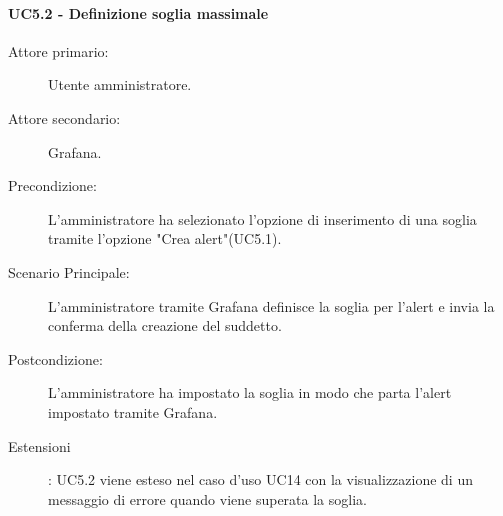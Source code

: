 \paragraph{UC5.2 - Definizione soglia massimale}
\label{sssec:uc5.2}
\begin{description}
	\item[Attore primario:] Utente amministratore.
	\item[Attore secondario:] Grafana.
	\item[Precondizione:] L'amministratore ha selezionato l'opzione di inserimento di una soglia tramite l'opzione "Crea alert"(UC5.1).
	\item[Scenario Principale:] L'amministratore tramite Grafana definisce la soglia per l'alert e invia la conferma della creazione del suddetto.
	\item[Postcondizione:] L'amministratore ha impostato la soglia in modo che parta l'alert impostato tramite Grafana.
	\item[Estensioni]: UC5.2 viene esteso nel caso d'uso UC14 con la visualizzazione di un messaggio di errore quando viene superata la soglia.
\end{description}
